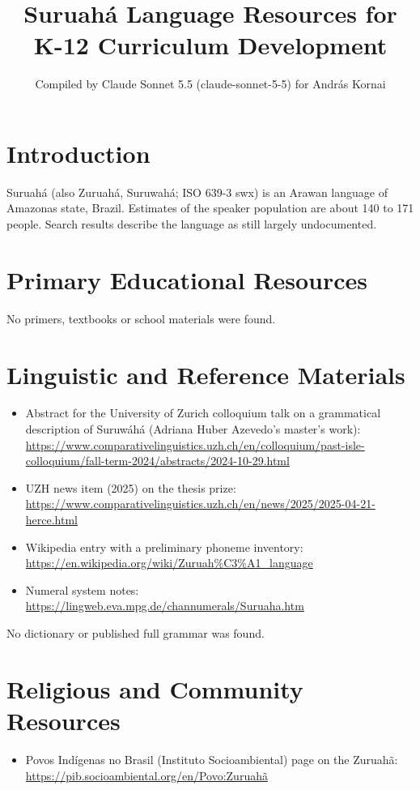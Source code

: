\documentclass[12pt]{article}
\title{Suruah\'a Language Resources for K-12 Curriculum Development}
\author{Compiled by Claude Sonnet 5.5 (claude-sonnet-5-5) for Andr\'as Kornai}
\date{}
\begin{document}
\maketitle

\section{Introduction}
Suruah\'a (also Zuruah\'a, Suruwah\'a; ISO 639-3 swx) is an Arawan language of Amazonas state, Brazil. Estimates of the speaker population are about 140 to 171 people. Search results describe the language as still largely undocumented.

\section{Primary Educational Resources}
No primers, textbooks or school materials were found.

\section{Linguistic and Reference Materials}
\begin{itemize}
\item Abstract for the University of Zurich colloquium talk on a grammatical description of Suruw\'ah\'a (Adriana Huber Azevedo's master's work): \url{https://www.comparativelinguistics.uzh.ch/en/colloquium/past-isle-colloquium/fall-term-2024/abstracts/2024-10-29.html}
\item UZH news item (2025) on the thesis prize: \url{https://www.comparativelinguistics.uzh.ch/en/news/2025/2025-04-21-herce.html}
\item Wikipedia entry with a preliminary phoneme inventory: \url{https://en.wikipedia.org/wiki/Zuruah%C3%A1_language}
\item Numeral system notes: \url{https://lingweb.eva.mpg.de/channumerals/Suruaha.htm}
\end{itemize}
No dictionary or published full grammar was found.

\section{Religious and Community Resources}
\begin{itemize}
\item Povos Ind\'igenas no Brasil (Instituto Socioambiental) page on the Zuruah\~a: \url{https://pib.socioambiental.org/en/Povo:Zuruahã}
\end{itemize}
\end{document}
